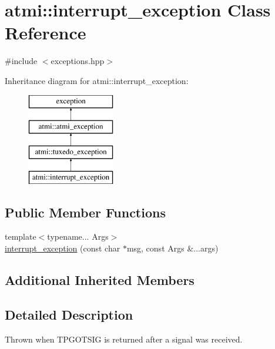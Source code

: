\hypertarget{classatmi_1_1interrupt__exception}{\section{atmi\+:\+:interrupt\+\_\+exception Class Reference}
\label{classatmi_1_1interrupt__exception}
}


{\ttfamily \#include $<$exceptions.\+hpp$>$}

Inheritance diagram for atmi\+:\+:interrupt\+\_\+exception\+:\begin{figure}[H]
\begin{center}
\leavevmode
\includegraphics[height=4.000000cm]{classatmi_1_1interrupt__exception}
\end{center}
\end{figure}
\subsection*{Public Member Functions}
\begin{DoxyCompactItemize}
\item 
{\footnotesize template$<$typename... Args$>$ }\\\hyperlink{classatmi_1_1interrupt__exception_afe1b916f68a10fe0627f396052d45c9f}{interrupt\+\_\+exception} (const char $\ast$msg, const Args \&...args)
\end{DoxyCompactItemize}
\subsection*{Additional Inherited Members}


\subsection{Detailed Description}
Thrown when T\+P\+G\+O\+T\+S\+I\+G is returned after a signal was received. 

